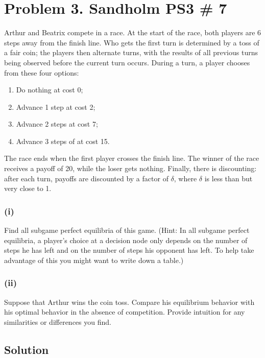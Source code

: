 \documentclass[10pt, a4paper]{article}
\begin{document}
\section*{Problem 3. Sandholm PS3 \# 7}
  Arthur and Beatrix compete in a race. At the start of the race, both players are 6 steps away from the finish line. Who gets the first turn is determined by a toss of a fair coin; the players then alternate turns, with the results of all previous turns being observed before the current turn occurs.
  During a turn, a player chooses from these four options:
  \begin{enumerate}
    \item Do nothing at cost 0;
    \item Advance 1 step at cost 2;
    \item Advance 2 steps at cost 7;
    \item Advance 3 steps of at cost 15.
  \end{enumerate}
  The race ends when the first player crosses the finish line. The winner of the race receives a payoff of 20, while the loser gets nothing. Finally, there is discounting: after each turn, payoffs are discounted by a factor of $\delta$, where $\delta$ is less than but very close to 1.
  \subsubsection*{(i)}
  Find all subgame perfect equilibria of this game. (Hint: In all subgame perfect equilibria, a player's choice at a decision node only depends on the number of steps he has left and on the number of steps his opponent has left. To help take advantage of this you might want to write down a table.)
  \subsubsection*{(ii)} 
  Suppose that Arthur wins the coin toss. Compare his equilibrium behavior with his optimal behavior in the absence of competition. Provide intuition for any similarities or differences you find.
  \subsection*{Solution}
\end{document}
